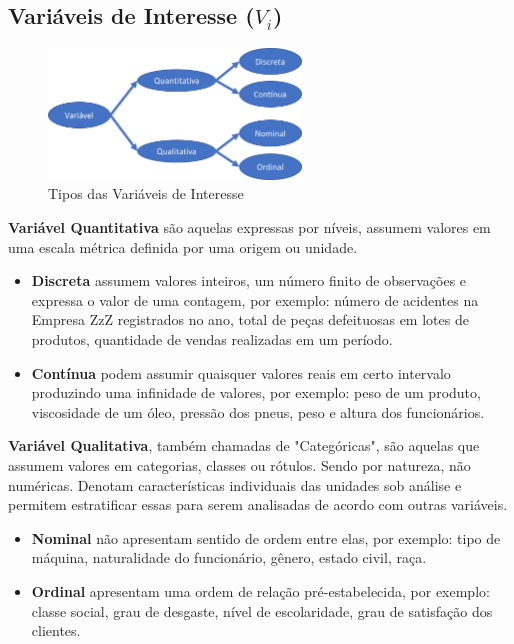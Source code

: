 \documentclass[a4paper,11pt]{article}
\begin{document}
\subsection{Variáveis de Interesse ($V_{i}$)}

\begin{figure}[H]
	\centering
	\includegraphics[width=0.6\textwidth]{imagens/tiposVariaveis.png}
	\caption{Tipos das Variáveis de Interesse}
\end{figure}

\textbf{Variável Quantitativa} são aquelas expressas por níveis, assumem valores em uma escala métrica definida por uma origem ou unidade. \vspace{-1em} 
\begin{itemize}
	\item \textbf{Discreta} assumem valores inteiros, um número finito de observações e expressa o valor de uma contagem, por exemplo: número de acidentes na Empresa ZzZ registrados no ano, total de peças defeituosas em lotes de produtos, quantidade de vendas realizadas em um período.
	\item \textbf{Contínua} podem assumir quaisquer valores reais em certo intervalo produzindo uma infinidade de valores, por exemplo: peso de um produto, viscosidade de um óleo, pressão dos pneus, peso e altura dos funcionários.
\end{itemize}

\textbf{Variável Qualitativa}, também chamadas de "Categóricas", são aquelas que assumem valores em categorias, classes ou rótulos. Sendo por natureza, não numéricas. Denotam características individuais das unidades sob análise e permitem estratificar essas para serem analisadas de acordo com outras variáveis. \vspace{-1em}
\begin{itemize}
	\item \textbf{Nominal} não apresentam sentido de ordem entre elas, por exemplo: tipo de máquina, naturalidade do funcionário, gênero, estado civil, raça.
	\item \textbf{Ordinal} apresentam uma ordem de relação pré-estabelecida, por exemplo: classe social, grau de desgaste, nível de escolaridade, grau de satisfação dos clientes.
\end{itemize}
\end{document}

